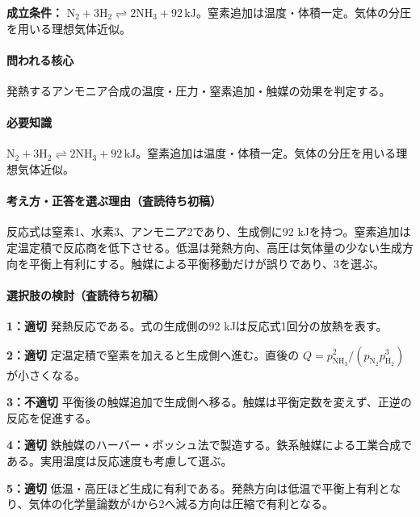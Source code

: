 \noindent\textbf{成立条件：} \(\mathrm{N_2+3H_2\rightleftharpoons2NH_3}+92\,\mathrm{kJ}\)。窒素追加は温度・体積一定。気体の分圧を用いる理想気体近似。\par

\paragraph{問われる核心} 発熱するアンモニア合成の温度・圧力・窒素追加・触媒の効果を判定する。

\paragraph{必要知識} \(\mathrm{N_2+3H_2\rightleftharpoons2NH_3}+92\,\mathrm{kJ}\)。窒素追加は温度・体積一定。気体の分圧を用いる理想気体近似。

\paragraph{考え方・正答を選ぶ理由（査読待ち初稿）} 反応式は窒素1、水素3、アンモニア2であり、生成側に92 kJを持つ。窒素追加は定温定積で反応商を低下させる。低温は発熱方向、高圧は気体量の少ない生成方向を平衡上有利にする。触媒による平衡移動だけが誤りであり、3を選ぶ。

\paragraph{選択肢の検討（査読待ち初稿）}\mbox{}\par

\noindent\textbf{1：適切} 発熱反応である。式の生成側の92 kJは反応式1回分の放熱を表す。\par

\noindent\textbf{2：適切} 定温定積で窒素を加えると生成側へ進む。直後の \(Q=p_{\mathrm{NH_3}}^2/(p_{\mathrm{N_2}}p_{\mathrm{H_2}}^3)\) が小さくなる。\par

\noindent\textbf{3：不適切} 平衡後の触媒追加で生成側へ移る。触媒は平衡定数を変えず、正逆の反応を促進する。\par

\noindent\textbf{4：適切} 鉄触媒のハーバー・ボッシュ法で製造する。鉄系触媒による工業合成である。実用温度は反応速度も考慮して選ぶ。\par

\noindent\textbf{5：適切} 低温・高圧ほど生成に有利である。発熱方向は低温で平衡上有利となり、気体の化学量論数が4から2へ減る方向は圧縮で有利となる。\par

